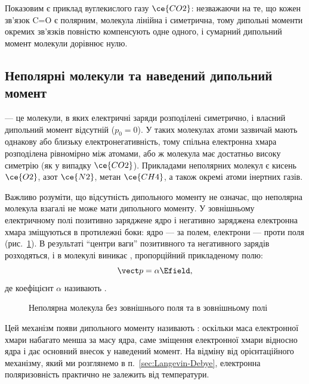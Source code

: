 Показовим є приклад вуглекислого газу $\ce{CO2}$: незважаючи на те, що кожен зв'язок C=O є полярним, молекула лінійна і симетрична, тому дипольні
моменти окремих зв'язків повністю компенсують одне одного, і сумарний дипольний момент молекули дорівнює нулю.

\subsection*{Неполярні молекули та наведений дипольний момент}


 --- це молекули, в яких електричні заряди розподілені симетрично, і власний дипольний момент відсутній ($p_0 = 0$).
У таких молекулах атоми зазвичай мають однакову або близьку електронегативність, тому спільна електронна хмара розподілена рівномірно між
атомами, або ж молекула має достатньо високу симетрію (як у випадку $\ce{CO2}$). Прикладами неполярних молекул є кисень $\ce{O2}$, азот
$\ce{N2}$, метан $\ce{CH4}$, а також окремі атоми інертних газів.


Важливо розуміти, що відсутність  дипольного моменту не означає, що неполярна молекула взагалі не може мати дипольного моменту. У
зовнішньому електричному полі позитивно заряджене ядро і негативно заряджена електронна хмара зміщуються в протилежні боки: ядро --- за полем,
електрони --- проти поля (рис.~\ref{pic:InducedDipole}). В результаті \enquote{центри ваги} позитивного та негативного зарядів розходяться, і в молекулі
виникає , пропорційний прикладеному полю:
\begin{equation}\label{eq:InducedDipole}
	\vect p = \alpha \Efield,
\end{equation}
де коефіцієнт $\alpha$ називають .

\begin{figure}[h!]\centering
	\caption{Неполярна молекула без зовнішнього поля та в зовнішньому полі\label{pic:InducedDipole}}
\end{figure} Цей механізм появи дипольного моменту називають : оскільки маса електронної хмари набагато менша за масу ядра, саме зміщення електронної хмари відносно ядра і дає
основний внесок у наведений момент. На відміну від орієнтаційного механізму, який ми розглянемо в п.~\ref{sec:Langevin-Debye}, електронна
поляризовність практично не залежить від температури.

